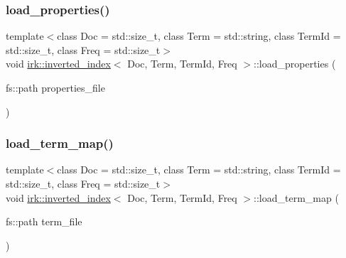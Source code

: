 \mbox{\label{classirk_1_1inverted__index_a592cccf4d8b77906e33e90b09f9dec7a}} 
\subsubsection{\texorpdfstring{load\+\_\+properties()}{load\_properties()}}
{\footnotesize\ttfamily template$<$class Doc  = std\+::size\+\_\+t, class Term  = std\+::string, class Term\+Id  = std\+::size\+\_\+t, class Freq  = std\+::size\+\_\+t$>$ \\
void \mbox{\hyperlink{classirk_1_1inverted__index}{irk\+::inverted\+\_\+index}}$<$ Doc, Term, Term\+Id, Freq $>$\+::load\+\_\+properties (\begin{DoxyParamCaption}\item[{fs\+::path}]{properties\+\_\+file }\end{DoxyParamCaption})\hspace{0.3cm}{\ttfamily [inline]}}

\mbox{\label{classirk_1_1inverted__index_af26ea157a030b67feff19878afbacbdd}} 
\subsubsection{\texorpdfstring{load\+\_\+term\+\_\+map()}{load\_term\_map()}}
{\footnotesize\ttfamily template$<$class Doc  = std\+::size\+\_\+t, class Term  = std\+::string, class Term\+Id  = std\+::size\+\_\+t, class Freq  = std\+::size\+\_\+t$>$ \\
void \mbox{\hyperlink{classirk_1_1inverted__index}{irk\+::inverted\+\_\+index}}$<$ Doc, Term, Term\+Id, Freq $>$\+::load\+\_\+term\+\_\+map (\begin{DoxyParamCaption}\item[{fs\+::path}]{term\+\_\+file }\end{DoxyParamCaption})\hspace{0.3cm}{\ttfamily [inline]}}

\mbox{\label{classirk_1_1inverted__index_a0b389492f9ab680e28f801590472069c}} 
